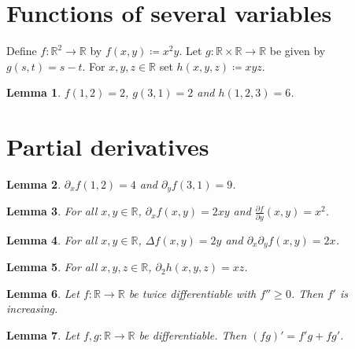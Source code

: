 \documentclass{article}
\newtheorem{lemma}{Lemma}
\begin{document}
\section{Functions of several variables}

Define $f:\mathbb R^2\to\mathbb R$ by $f(x,y)\coloneqq x^2y$.
Let $g:\mathbb R\times\mathbb R\to\mathbb R$ be given by $g(s,t)=s-t$.
For $x,y,z\in\mathbb R$ set $h(x,y,z)\coloneqq xyz$.

\begin{lemma}\label{values}
$f(1,2)=2$, $g(3,1)=2$ and $h(1,2,3)=6$.
\end{lemma}

\section{Partial derivatives}

\begin{lemma}\label{partials}
$\partial_x f(1,2)=4$ and $\partial_y f(3,1)=9$.
\end{lemma}

\begin{lemma}\label{identities}
For all $x,y\in\mathbb R$, $\partial_x f(x,y)=2xy$ and $\frac{\partial f}{\partial y}(x,y)=x^2$.
\end{lemma}

\begin{lemma}\label{second}
For all $x,y\in\mathbb R$, $\Delta f(x,y)=2y$ and $\partial_x\partial_y f(x,y)=2x$.
\end{lemma}

\begin{lemma}\label{numbered}
For all $x,y,z\in\mathbb R$, $\partial_2 h(x,y,z)=xz$.
\end{lemma}

\begin{lemma}\label{second-derivative}
Let $f\colon\mathbb{R}\to\mathbb{R}$ be twice differentiable with $f''\ge0$. Then $f'$ is increasing.
\end{lemma}

\begin{lemma}\label{product-rule}
Let $f,g\colon\mathbb{R}\to\mathbb{R}$ be differentiable. Then $(fg)'=f'g+fg'$.
\end{lemma}
\end{document}
